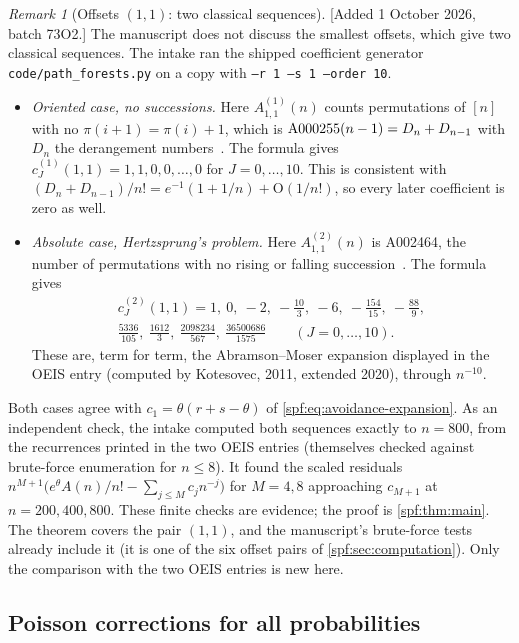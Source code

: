 \documentclass[11pt]{article}
\numberwithin{equation}{section}
\theoremstyle{definition}
\theoremstyle{remark}
\newtheorem{remark}[theorem]{Remark}
\theoremstyle{definition}
\newcommand{\bigO}{\mathrm O}
\begin{document}
\begin{remark}[Offsets $(1,1)$: two classical sequences]
\label{spf:rem:offsets-one-one}
[Added 1 October 2026, batch 73O2.] The manuscript does not discuss the
smallest offsets, which give two classical sequences. The intake ran
the shipped coefficient generator \texttt{code/path\_forests.py} on a copy with
\texttt{--r 1 --s 1 --order 10}.
\begin{itemize}
\item \emph{Oriented case, no successions.} Here
 $A^{(1)}_{1,1}(n)$ counts permutations of $[n]$ with no $\pi(i+1)=\pi(i)+1$,
 which is $\textnormal{A000255}(n-1)=D_n+D_{n-1}$ with $D_n$ the derangement
 numbers~\cite{oeis000255}. The formula gives
 $c_J^{(1)}(1,1)=1,1,0,0,\ldots,0$ for $J=0,\ldots,10$. This is consistent
 with $(D_n+D_{n-1})/n!=e^{-1}(1+1/n)+\bigO(1/n!)$, so every later
 coefficient is zero as well.
\item \emph{Absolute case, Hertzsprung's problem.} Here
 $A^{(2)}_{1,1}(n)$ is \textnormal{A002464}, the number of permutations with
 no rising or falling succession~\cite{oeis002464}. The formula gives
 \begin{gather*}
 c_J^{(2)}(1,1)=1,\ 0,\ -2,\ -\tfrac{10}{3},\ -6,\ -\tfrac{154}{15},\
 -\tfrac{88}{9},\\
 \tfrac{5336}{105},\ \tfrac{1612}{3},\
 \tfrac{2098234}{567},\ \tfrac{36500686}{1575}\qquad(J=0,\ldots,10).
 \end{gather*}
 These are, term for term, the Abramson--Moser expansion displayed in the
 OEIS entry (computed by Kotesovec, 2011, extended 2020), through $n^{-10}$.
\end{itemize}
Both cases agree with $c_1=\theta(r+s-\theta)$ of \eqref{spf:eq:avoidance-expansion}.
As an independent check, the intake computed both sequences exactly to
$n=800$, from the recurrences printed in the two OEIS entries (themselves
checked against brute-force enumeration for $n\le8$). It found the scaled
residuals $n^{M+1}\bigl(e^{\theta}A(n)/n!-\sum_{j\le M}c_jn^{-j}\bigr)$ for
$M=4,8$ approaching $c_{M+1}$ at $n=200,400,800$. These finite checks are
evidence; the proof is \cref{spf:thm:main}. The theorem covers the pair
$(1,1)$, and the manuscript's brute-force tests already include it (it is one
of the six offset pairs of \cref{spf:sec:computation}). Only the comparison
with the two OEIS entries is new here.
\end{remark}

\subsection{Poisson corrections for all probabilities}
\end{document}
